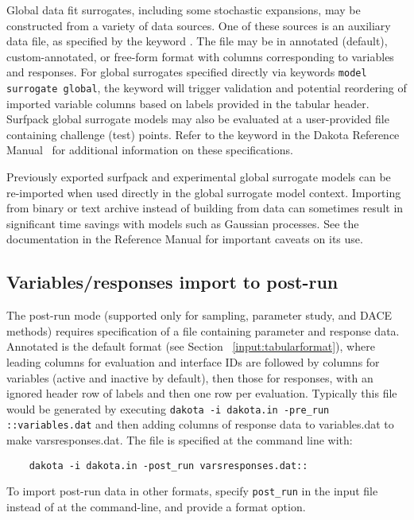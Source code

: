 Global data fit surrogates, including some stochastic expansions, may
be constructed from a variety of data sources.  One of these sources
is an auxiliary data file, as specified by the keyword
.  The file may be in annotated
(default), custom-annotated, or free-form format with columns
corresponding to variables and responses.  For global surrogates
specified directly via keywords \texttt{model surrogate global}, the
 keyword will trigger validation and
potential reordering of imported variable columns based on labels
provided in the tabular header. Surfpack global surrogate models may
also be evaluated at a user-provided file containing challenge (test)
points. Refer to the  keyword in the Dakota Reference
Manual~\cite{RefMan} for additional information on these
specifications.

Previously exported surfpack and experimental global surrogate models
can be re-imported when used directly in the global surrogate model
context. Importing from binary or text archive instead of building
from data can sometimes result in significant time savings with models
such as Gaussian processes. See the 
documentation in the Reference Manual for important caveats on its
use.

\subsection{Variables/responses import to post-run}

The post-run mode (supported only for sampling, parameter study, and
DACE methods) requires specification of a file containing parameter
and response data.  Annotated is the default format (see Section
~\ref{input:tabularformat}), where leading columns for evaluation and
interface IDs are followed by columns for variables (active and
inactive by default), then those for responses, with an ignored header
row of labels and then one row per evaluation.  Typically this file
would be generated by executing \texttt{dakota -i dakota.in -pre\_run
  ::variables.dat} and then adding columns of response data to
variables.dat to make varsresponses.dat.  The file is specified at the
command line with:
\begin{small}
\begin{verbatim}
    dakota -i dakota.in -post_run varsresponses.dat::
\end{verbatim}
\end{small}
To import post-run data in other formats, specify \texttt{post\_run}
in the input file instead of at the command-line, and provide a format
option.

